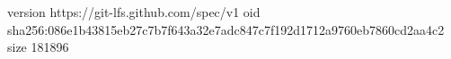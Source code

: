 version https://git-lfs.github.com/spec/v1
oid sha256:086e1b43815eb27c7b7f643a32e7adc847c7f192d1712a9760eb7860cd2aa4c2
size 181896

